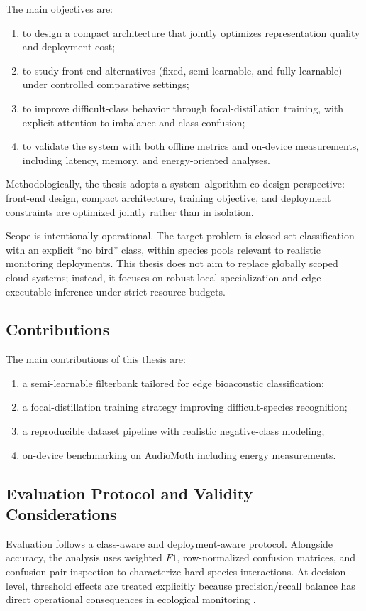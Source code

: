 \documentclass[a4paper,singleside,12pt]{report} %
\begin{document}
	The main objectives are:
	\begin{enumerate}
		\item to design a compact architecture that jointly optimizes representation quality and deployment cost;
		\item to study front-end alternatives (fixed, semi-learnable, and fully learnable) under controlled comparative settings;
		\item to improve difficult-class behavior through focal-distillation training, with explicit attention to imbalance and class confusion;
		\item to validate the system with both offline metrics and on-device measurements, including latency, memory, and energy-oriented analyses.
	\end{enumerate}

	Methodologically, the thesis adopts a system--algorithm co-design perspective: front-end design, compact architecture, training objective, and deployment constraints are optimized jointly rather than in isolation.

	Scope is intentionally operational. The target problem is closed-set classification with an explicit ``no bird'' class, within species pools relevant to realistic monitoring deployments. This thesis does not aim to replace globally scoped cloud systems; instead, it focuses on robust local specialization and edge-executable inference under strict resource budgets.

	\subsection{Contributions}
	The main contributions of this thesis are:
	\begin{enumerate}
		\item a semi-learnable filterbank tailored for edge bioacoustic classification;
		\item a focal-distillation training strategy improving difficult-species recognition;
		\item a reproducible dataset pipeline with realistic negative-class modeling;
		\item on-device benchmarking on AudioMoth including energy measurements.
	\end{enumerate}

	\subsection{Evaluation Protocol and Validity Considerations}
	Evaluation follows a class-aware and deployment-aware protocol. Alongside accuracy, the analysis uses weighted \(F1\), row-normalized confusion matrices, and confusion-pair inspection to characterize hard species interactions. At decision level, threshold effects are treated explicitly because precision/recall balance has direct operational consequences in ecological monitoring \cite{perezgranados2023birdnet,stowell2019birdaudiodetection}.
\end{document}
